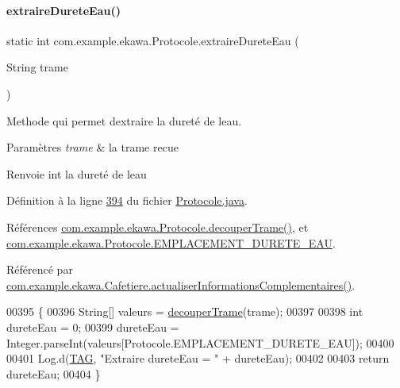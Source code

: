 \paragraph{\texorpdfstring{extraire\+Durete\+Eau()}{extraireDureteEau()}}
{\footnotesize\ttfamily static int com.\+example.\+ekawa.\+Protocole.\+extraire\+Durete\+Eau (\begin{DoxyParamCaption}\item[{String}]{trame }\end{DoxyParamCaption})\hspace{0.3cm}{\ttfamily [static]}}



Methode qui permet d\textquotesingle{}extraire la dureté de l\textquotesingle{}eau. 


\begin{DoxyParams}{Paramètres}
{\em trame} & la trame recue \\
\hline
\end{DoxyParams}
\begin{DoxyReturn}{Renvoie}
int la dureté de l\textquotesingle{}eau 
\end{DoxyReturn}


Définition à la ligne \hyperlink{_protocole_8java_source_l00394}{394} du fichier \hyperlink{_protocole_8java_source}{Protocole.\+java}.



Références \hyperlink{_protocole_8java_source_l00208}{com.\+example.\+ekawa.\+Protocole.\+decouper\+Trame()}, et \hyperlink{_protocole_8java_source_l00067}{com.\+example.\+ekawa.\+Protocole.\+E\+M\+P\+L\+A\+C\+E\+M\+E\+N\+T\+\_\+\+D\+U\+R\+E\+T\+E\+\_\+\+E\+AU}.



Référencé par \hyperlink{_cafetiere_8java_source_l00574}{com.\+example.\+ekawa.\+Cafetiere.\+actualiser\+Informations\+Complementaires()}.


\begin{DoxyCode}
00395     \{
00396         String[] valeurs = \hyperlink{classcom_1_1example_1_1ekawa_1_1_protocole_a23c261e4ab5ad3c2ac60187f04ae40ea}{decouperTrame}(trame);
00397 
00398         \textcolor{keywordtype}{int} dureteEau = 0;
00399         dureteEau = Integer.parseInt(valeurs[Protocole.EMPLACEMENT\_DURETE\_EAU]);
00400 
00401         Log.d(\hyperlink{classcom_1_1example_1_1ekawa_1_1_protocole_ae9b68fa0daac528421b887f19413f8f5}{TAG}, \textcolor{stringliteral}{"Extraire dureteEau = "} + dureteEau);
00402 
00403         \textcolor{keywordflow}{return} dureteEau;
00404     \}
\end{DoxyCode}
\mbox{\label{classcom_1_1example_1_1ekawa_1_1_protocole_a7cdbcbd7aa67f4b0cebb963725b0c67e}} 
